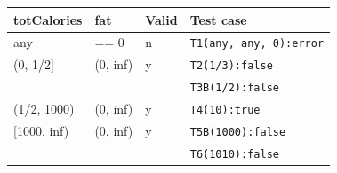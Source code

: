 \documentclass[12pt]{article}
\begin{document}
\begin{center}
  \begin{tabular}{|l|l|l|l|}
    \hline
    totCalories & fat & Valid & Test case \\
    \hline
    any & == 0 & n & \texttt{T1(any, any, 0):error} \\
    \hline
    (0, 1/2] & (0, inf) & y & \texttt{T2(1/3):false} \\  
     & & & \texttt{T3B(1/2):false} \\
    \hline
    (1/2, 1000) & (0, inf) & y & \texttt{T4(10):true} \\
    \hline
    [1000, inf) & (0, inf) & y & \texttt{T5B(1000):false} \\
     & & & \texttt{T6(1010):false} \\
    \hline
  \end{tabular}
\end{center}
\end{document}
